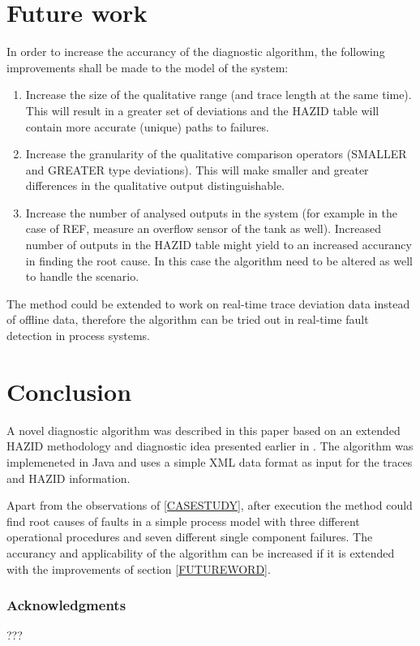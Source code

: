 \documentclass[conference]{IEEEtran}
\begin{document}
\section {Future work}

In order to increase the accurancy of the diagnostic algorithm, the following improvements shall be made to the model of the system:
\begin{enumerate}
\item Increase the size of the qualitative range (and trace length at the same time). This will result in a greater set of deviations and the HAZID table will contain more accurate (unique) paths to failures.
\item Increase the granularity of the qualitative comparison operators (SMALLER and GREATER type deviations). This will make smaller and greater differences in the qualitative output distinguishable.
\item Increase the number of analysed outputs in the system (for example in the case of REF, measure an overflow sensor of the tank as well). Increased number of outputs in the HAZID table might yield to an increased accurancy in finding the root cause. In this case the algorithm need to be altered as well to handle the scenario.
\end{enumerate}

The method could be extended to work on real-time trace deviation data instead of offline data, therefore the algorithm can be tried out in real-time fault detection in process systems.

\section{Conclusion}
A novel diagnostic algorithm was described in this paper based on an extended HAZID methodology and diagnostic idea presented earlier in \cite{KES2011}. The algorithm was implemeneted in Java and uses a simple XML data format as input for the traces and HAZID information.

Apart from the observations of \ref{CASESTUDY}, after execution the method could find root causes of faults in a simple process model with three different operational procedures and seven different single component failures. The accurancy and applicability of the algorithm can be increased if it is extended with the improvements of section \ref{FUTUREWORD}.

\subsubsection{Acknowledgments}

???
\end{document}
